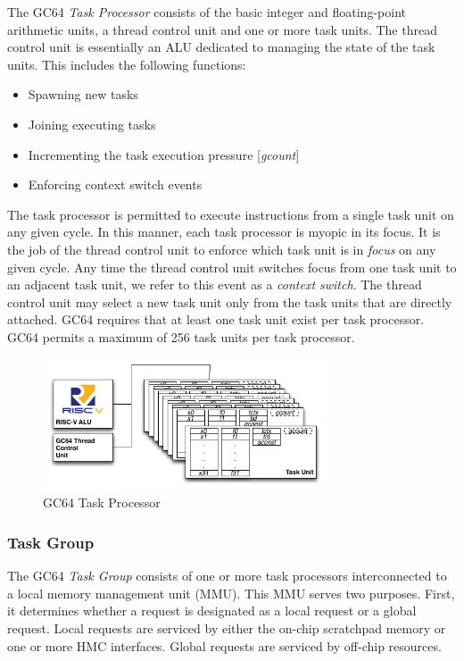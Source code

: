 \documentclass{article}
\begin{document}
The GC64 \emph{Task Processor} consists of the basic integer and floating-point 
arithmetic units, a thread control unit and one or more task units.  The thread control 
unit is essentially an ALU dedicated to managing the state of the task units.  This includes
the following functions: 

\begin{itemize}
\item Spawning new tasks
\item Joining executing tasks
\item Incrementing the task execution pressure [\emph{gcount}]
\item Enforcing context switch events
\end{itemize}

The task processor is permitted to execute instructions from a single task unit on any given 
cycle.  In this manner, each task processor is myopic in its focus.  It is the job of the thread control
unit to enforce which task unit is in \emph{focus} on any given cycle.  Any time the thread control 
unit switches focus from one task unit to an adjacent task unit, we refer to this event as a
\emph{context switch}.  The thread control unit may select a new task unit only 
from the task units that are directly attached.  GC64 requires that at least one task unit
exist per task processor.  GC64 permits a maximum of 256 task units per task processor. 

\begin{figure}[h!]
\begin{center}
\includegraphics[width=0.75\textwidth]{gc64-task-proc.png}
\caption{GC64 Task Processor}
\end{center}
\label{figure:taskproc}
\end{figure}  


\subsubsection{Task Group}

The GC64 \emph{Task Group} consists of one or more task processors interconnected to a
local memory management unit (MMU).  This MMU serves two purposes.  First, it determines
whether a request is designated as a local request or a global request.  Local requests are 
serviced by either the on-chip scratchpad memory or one or more HMC interfaces.  Global 
requests are serviced by off-chip resources.  
\end{document}
